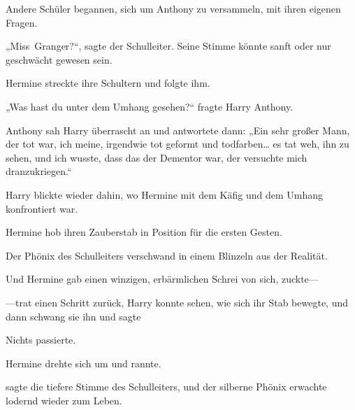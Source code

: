 Andere Schüler begannen, sich um Anthony zu versammeln, mit ihren eigenen Fragen.

„Miss~Granger?“, sagte der Schulleiter. Seine Stimme könnte sanft oder nur geschwächt gewesen sein.

Hermine streckte ihre Schultern und folgte ihm.

„Was hast du unter dem Umhang gesehen?“ fragte Harry Anthony.

Anthony sah Harry überrascht an und antwortete dann: „Ein sehr großer Mann, der tot war, ich meine, irgendwie tot geformt und todfarben… es tat weh, ihn zu sehen, und ich wusste, dass das der Dementor war, der versuchte mich dranzukriegen.“

Harry blickte wieder dahin, wo Hermine mit dem Käfig und dem Umhang konfrontiert war.

Hermine hob ihren Zauberstab in Position für die ersten Gesten.

Der Phönix des Schulleiters verschwand in einem Blinzeln aus der Realität.

Und Hermine gab einen winzigen, erbärmlichen Schrei von sich, zuckte—

—trat einen Schritt zurück, Harry konnte sehen, wie sich ihr Stab bewegte, und dann schwang sie ihn und sagte 

Nichts passierte.

Hermine drehte sich um und rannte.

 sagte die tiefere Stimme des Schulleiters, und der silberne Phönix erwachte lodernd wieder zum Leben.

